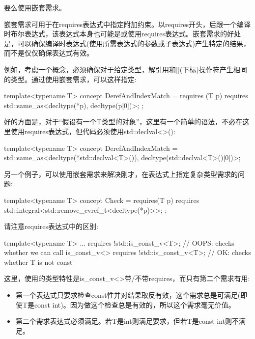 要么使用嵌套需求。


嵌套需求可用于在requires表达式中指定附加约束。以requires开头，后跟一个编译时布尔表达式，该表达式本身也可能是或使用requires表达式。嵌套需求的好处是，可以确保编译时表达式(使用所需表达式的参数或子表达式)产生特定的结果，而不是仅仅确保表达式有效。

例如，考虑一个概念，必须确保对于给定类型，解引用和[](下标)操作符产生相同的类型。通过使用嵌套需求，可以这样指定:

\begin{cpp}
template<typename T>
concept DerefAndIndexMatch = requires (T p) {
								requires std::same_as<decltype(*p),
										decltype(p[0])>;
							};
\end{cpp}

好的方面是，对于“假设有一个T类型的对象”，这里有一个简单的语法，不必在这里使用requires表达式，但代码必须使用std::declval<>():

\begin{cpp}
template<typename T>
concept DerefAndIndexMatch = std::same_as<decltype(*std::declval<T>()),
			 decltype(std::declval<T>()[0])>;
\end{cpp}

另一个例子，可以使用嵌套需求来解决刚才，在表达式上指定复杂类型需求的问题:

\begin{cpp}
template<typename T>
concept Check = requires(T p) {
	requires std::integral<std::remove_cvref_t<decltype(*p)>>;
};
\end{cpp}

请注意requires表达式中的区别:

\begin{cpp}
template<typename T>
... requires {
	!std::is_const_v<T>; // OOPS: checks whether we can call is_const_v<>
	requires !std::is_const_v<T>; // OK: checks whether T is not const
}
\end{cpp}

这里，使用的类型特性是is\_const\_v<>带/不带requires，而只有第二个需求有用:

\begin{itemize}
\item
第一个表达式只要求检查const性并对结果取反有效，这个需求总是可满足(即使T是const int)。因为做这个检查总是有效的，所以这个需求毫无价值。

\item
第二个需求表达式必须满足。若T是int则满足要求，但若T是const int则不满足。
\end{itemize}

